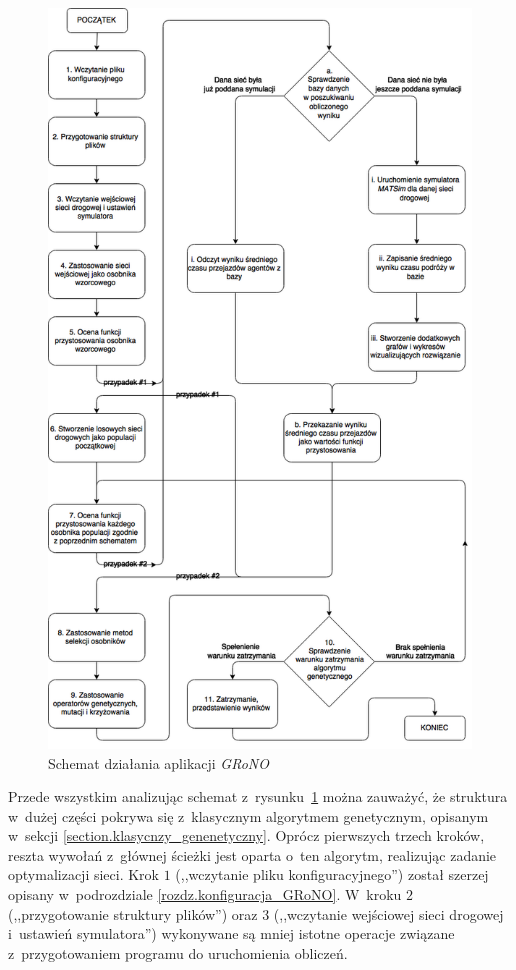 \documentclass[twoside,12pt]{report}
\begin{document}
\begin{figure}[htbp]
	\centering
	\includegraphics[width=\textwidth,height=\textheight,keepaspectratio]{img/grono}
	\caption{Schemat działania aplikacji \textit{GRoNO}}
	\label{fig:grono_schemat}
\end{figure}

Przede wszystkim analizując schemat z~rysunku~\ref{fig:grono_schemat} można zauważyć, że struktura w~dużej części pokrywa się z~klasycznym algorytmem genetycznym, opisanym w~sekcji \ref{section.klasycnzy_genenetyczny}. Oprócz pierwszych trzech kroków, reszta wywołań z~głównej ścieżki jest oparta o~ten algorytm, realizując zadanie optymalizacji sieci. Krok $1$ (,,wczytanie pliku konfiguracyjnego'') został szerzej opisany w~podrozdziale \ref{rozdz.konfiguracja_GRoNO}. W~kroku $2$ (,,przygotowanie struktury plików'') oraz $3$ (,,wczytanie wejściowej sieci drogowej i~ustawień symulatora'') wykonywane są mniej istotne operacje związane z~przygotowaniem programu do uruchomienia obliczeń.
\end{document}
